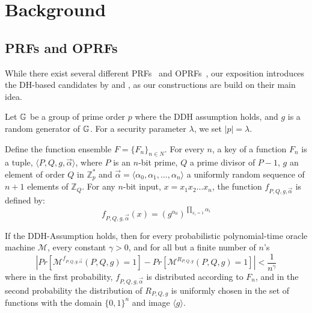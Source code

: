 \section{Background}

\subsection{PRFs and OPRFs}
While there exist several different
PRFs~\cite{chaum,prf,dodis,ggm,lewko,bonehprf} and
OPRFs~\cite{oprf,stan,chase,koles,boneh,kia}, our exposition
introduces the DH-based candidates by \citet{prf} and \citet{oprf}, as
our constructions are build on their main idea.

Let $\mathbb{G}$ be a group of prime order $p$ where the DDH assumption
holds, and $g$ is a random generator of $\mathbb{G}$. For a security
parameter $\lambda$, we set $|p|=\lambda$.


\begin{construction} \label{nrprf}
Define the function ensemble $F = \{F_n\}_{n\in N}$.  For every $n$, a key of a function $F_n$ is a tuple, $\langle P,Q,g,\vec{\alpha}\rangle$, 
where $P$ is an $n$-bit prime, $Q$ a prime divisor of $P-1$, $g$ an element of order $Q$ in $\mathbb{Z}_{p}^*$ and $\vec{\alpha}=\langle 
\alpha_0,\alpha_1, \ldots , \alpha_n \rangle$ a uniformly random sequence of $n+1$ elements of $\mathbb{Z}_Q$.  For any $n$-bit input, $x=x_1 x_2 \ldots x_n$, the 
function $f_{P,Q,g,\vec{\alpha}}$ is defined by:
 $$f_{P,Q,g,\vec{\alpha}}(x) = (g^{\alpha_0})^{\prod_{x_i=1}\alpha_i}$$
\end{construction}

\begin{theorem}
\label{theorem:naor}
If the DDH-Assumption holds, then for every probabilistic polynomial-time oracle machine $\mathcal{M}$, every constant $\gamma > 0$, and for all but a finite number of $n$'s
$$| Pr[\mathcal{M}^{f_{P,Q,g,\vec{\alpha}}}(P,Q,g)=1] - Pr[\mathcal{M}^{R_{P,Q,g}}(P,Q,g) = 1]| < \frac{1}{n^\gamma} $$
where in the first probability, $f_{P,Q,g,\vec{\alpha}}$ is distributed according to $F_n$, and in the second probability the distribution of $R_{P,Q,g}$ is uniformly chosen in the set of functions with the domain $\{0,1\}^n$ and image $\langle g\rangle$.
\end{theorem}

